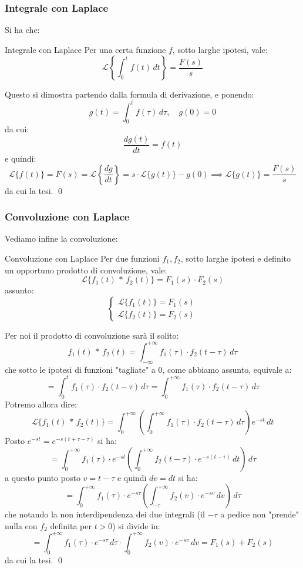 \documentclass[a4paper,11pt]{article}
\begin{document}
\subsubsection{Integrale con Laplace}
Si ha che:
\begin{theorem}{Integrale con Laplace}
Per una certa funzione $f$, sotto larghe ipotesi, vale:
$$
\mathcal{L}\left\{ \int_0^t f(t) \, dt \right\} = \frac{F(s)}{s}
$$
\end{theorem}

Questo si dimostra partendo dalla formula di derivazione, e ponendo:
$$
g(t) = \int_0^t f(\tau) \, d\tau, \quad g(0) = 0
$$
da cui:
$$
\frac{d g(t)}{dt} = f(t)
$$
e quindi:
$$
\mathcal{L}\{f(t)\} = F(s) = \mathcal{L} \left\{ \frac{dg}{dt} \right\} = s \cdot \mathcal{L}\{g(t)\} - g(0) \implies \mathcal{L}\{g(t)\} = \frac{F(s)}{s}
$$
da cui la tesi. \qed

\subsubsection{Convoluzione con Laplace}
Vediamo infine la convoluzione:
\begin{theorem}{Convoluzione con Laplace}
	Per due funzioni $f_1, f_2$, sotto larghe ipotesi e definito un opportuno prodotto di convoluzione, vale:
	$$
		\mathcal{L}\{ f_1(t) \, * \, f_2(t) \} = F_1(s) \cdot F_2(s)
	$$
	assunto:
	\[
		\begin{cases}
			\mathcal{L} \{ f_1(t) \} = F_1(s) \\ 	
			\mathcal{L} \{ f_2(t) \} = F_2(s) 	
		\end{cases}
	\]
\end{theorem}

Per noi il prodotto di convoluzione sarà il solito:
$$
f_1(t) \, * \, f_2(t) = \int_{-\infty}^{+ \infty} f_1(\tau) \cdot f_2(t - \tau) \, d\tau
$$
che sotto le ipotesi di funzioni "tagliate" a 0, come abbiamo assunto, equivale a:
$$
= \int_0^t f_1(\tau) \cdot f_2(t - \tau) \, d\tau = \int_0^{+\infty} f_1(\tau) \cdot f_2(t - \tau) \, d\tau
$$
Potremo allora dire:
$$
\mathcal{L} \{ f_1(t) \, * \, f_2(t) \} = \int_0^{+\infty} \left( \int_0^{+ \infty} f_1(\tau) \cdot f_2(t - \tau) \, d\tau \right) e^{-st} \, dt
$$
Posto $e^{-st} = e^{-s(t + \tau - \tau)}$ si ha:
$$
= \int_0^{+\infty} f_1(\tau) \cdot e^{-st} \left( \int_0^{+\infty} f_2(t - \tau) \cdot e^{-s(t - \tau)} \, dt \right) \, d\tau
$$
a questo punto posto $v = t - \tau$ e quindi $dv = dt$ si ha:
$$
= \int_0^{+\infty} f_1(\tau) \cdot e^{- s \tau} \left( \int_{-\tau}^{+\infty} f_2(v) \cdot e^{-sv} \, dv \right) \, d\tau
$$
che notando la non interdipendenza dei due integrali (il $-\tau$ a pedice non "prende" nulla con $f_2$ definita per $t > 0$) si divide in:
$$
= \int_0^{+\infty} f_1(\tau) \cdot e^{- s \tau} \, d\tau \cdot \int_0^{+\infty} f_2(v) \cdot e^{-sv} \, dv = F_1(s) + F_2(s)
$$
da cui la tesi. \qed
\end{document}
